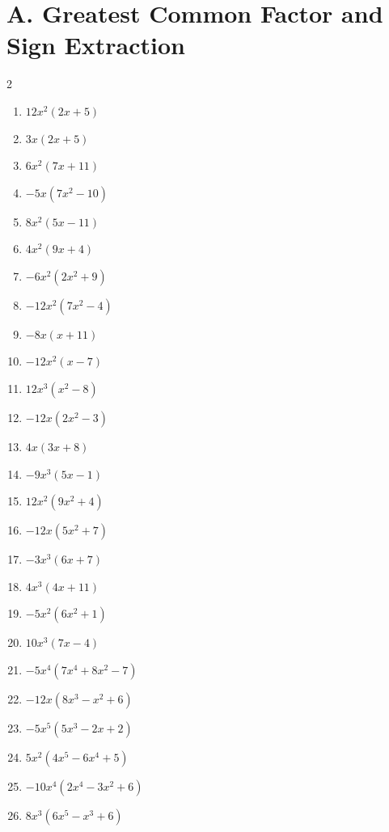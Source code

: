 \documentclass[11pt,oneside]{book}
\begin{document}
\section*{A. Greatest Common Factor and Sign Extraction}
\begin{multicols}{2}
\begin{enumerate}[leftmargin=*,label=\textbf{A\arabic*.},itemsep=0.45\baselineskip]
\item $ 12 x^{2} \left(2 x + 5\right) $
\item $ 3 x \left(2 x + 5\right) $
\item $ 6 x^{2} \left(7 x + 11\right) $
\item $ - 5 x \left(7 x^{2} - 10\right) $
\item $ 8 x^{2} \left(5 x - 11\right) $
\item $ 4 x^{2} \left(9 x + 4\right) $
\item $ - 6 x^{2} \left(2 x^{2} + 9\right) $
\item $ - 12 x^{2} \left(7 x^{2} - 4\right) $
\item $ - 8 x \left(x + 11\right) $
\item $ - 12 x^{2} \left(x - 7\right) $
\item $ 12 x^{3} \left(x^{2} - 8\right) $
\item $ - 12 x \left(2 x^{2} - 3\right) $
\item $ 4 x \left(3 x + 8\right) $
\item $ - 9 x^{3} \left(5 x - 1\right) $
\item $ 12 x^{2} \left(9 x^{2} + 4\right) $
\item $ - 12 x \left(5 x^{2} + 7\right) $
\item $ - 3 x^{3} \left(6 x + 7\right) $
\item $ 4 x^{3} \left(4 x + 11\right) $
\item $ - 5 x^{2} \left(6 x^{2} + 1\right) $
\item $ 10 x^{3} \left(7 x - 4\right) $
\item $ - 5 x^{4} \left(7 x^{4} + 8 x^{2} - 7\right) $
\item $ - 12 x \left(8 x^{3} - x^{2} + 6\right) $
\item $ - 5 x^{5} \left(5 x^{3} - 2 x + 2\right) $
\item $ 5 x^{2} \left(4 x^{5} - 6 x^{4} + 5\right) $
\item $ - 10 x^{4} \left(2 x^{4} - 3 x^{2} + 6\right) $
\item $ 8 x^{3} \left(6 x^{5} - x^{3} + 6\right) $

\end{enumerate}
\end{multicols}
\end{document}
